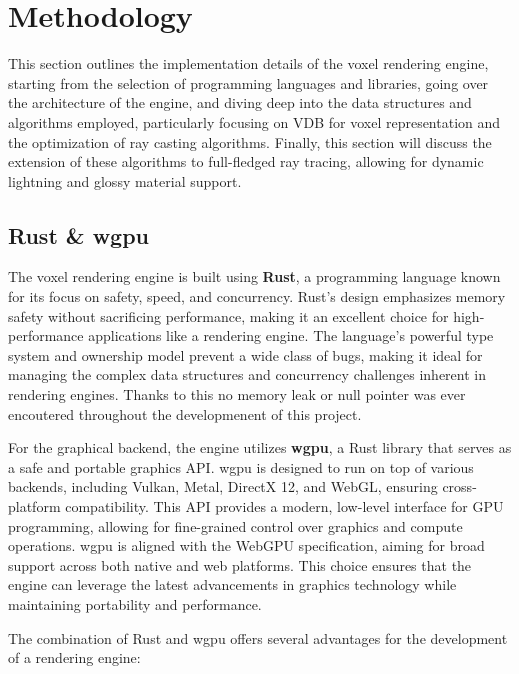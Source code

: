
\section{Methodology}
This section outlines the implementation details of the voxel rendering engine, starting from the selection of programming languages and libraries, going over the architecture of the engine, and diving deep into the data structures and algorithms employed, particularly focusing on VDB for voxel representation and the optimization of ray casting algorithms.
Finally, this section will discuss the extension of these algorithms to full-fledged ray tracing, allowing for dynamic lightning and glossy material support.

\subsection{Rust \& wgpu}

The voxel rendering engine is built using \textbf{Rust}, a programming language known for its focus on safety, speed, and concurrency\supercite{rustbook}.
Rust's design emphasizes memory safety without sacrificing performance, making it an excellent choice for high-performance applications like a rendering engine.
The language's powerful type system and ownership model prevent a wide class of bugs, making it ideal for managing the complex data structures and concurrency challenges inherent in rendering engines. Thanks to this no memory leak or null pointer was ever encoutered throughout the developmenent of this project.

For the graphical backend, the engine utilizes \textbf{wgpu}\supercite{wgpu:doc}, a Rust library that serves as a safe and portable graphics API. wgpu is designed to run on top of various backends, including Vulkan, Metal, DirectX 12, and WebGL, ensuring cross-platform compatibility. This API provides a modern, low-level interface for GPU programming, allowing for fine-grained control over graphics and compute operations. wgpu is aligned with the WebGPU specification\supercite{webgpu:doc}, aiming for broad support across both native and web platforms.
This choice ensures that the engine can leverage the latest advancements in graphics technology while maintaining portability and performance.

The combination of Rust and wgpu offers several advantages for the development of a rendering engine:

